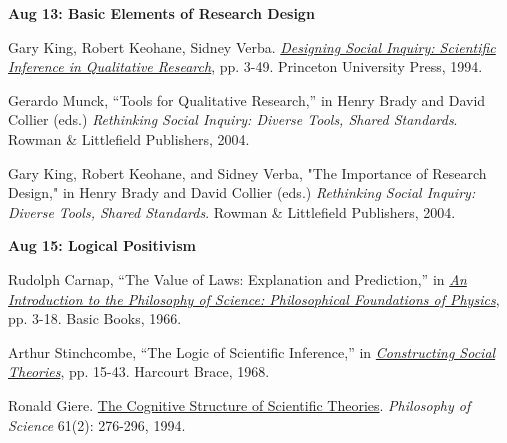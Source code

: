 \documentclass[letterpaper]{article}
\renewenvironment{itemize}{
  \begin{list}{}{
    \setlength{\leftmargin}{1.5em}
  }
}{
  \end{list}
}
\begin{document}
\begin{enumerate}
	\begin{itemize}
		\item {\bf Aug 13: Basic Elements of Research Design}
		\begin{itemize}
			\item[$\bullet$] Gary King, Robert Keohane, Sidney Verba. \href{https://sites.duke.edu/niou/files/2014/06/king94book.pdf}{\emph{Designing Social Inquiry: Scientific Inference in Qualitative Research}}, pp. 3-49. Princeton University Press, 1994.
			\item[$\bullet$] Gerardo Munck, ``Tools for Qualitative Research,'' in  Henry Brady and David Collier (eds.) \emph{Rethinking Social Inquiry: Diverse Tools, Shared Standards}. Rowman \& Littlefield Publishers, 2004.
			\item[$\bullet$] Gary King, Robert Keohane, and Sidney Verba, "The Importance of Research Design," in  Henry Brady and David Collier (eds.) \emph{Rethinking Social Inquiry: Diverse Tools, Shared Standards}. Rowman \& Littlefield Publishers, 2004. 
		\end{itemize}
	\end{itemize}


		\begin{itemize}
		\item {\bf Aug 15: Logical Positivism}
			\begin{itemize}
				\item[$\bullet$] Rudolph Carnap, ``The Value of Laws: Explanation and Prediction,'' in \href{https://archive.org/details/PhilosophicalFoundationsOfPhysics}{\emph{An Introduction to the Philosophy of Science: Philosophical Foundations of Physics}}, pp. 3-18. Basic Books, 1966.
				\item[$\bullet$] Arthur Stinchcombe, ``The Logic of Scientific Inference,'' in \href{http://www.nyu.edu/classes/jackson/design.of.social.research/Readings/Stinchcombe%20-%20Constructing%20Soc%20Thry%20Ch%202.pdf}{\emph{Constructing Social Theories}}, pp. 15-43. Harcourt Brace, 1968.
				\item[$\bullet$] Ronald Giere. \href{https://www.journals.uchicago.edu/doi/pdfplus/10.1086/289800}{The Cognitive Structure of Scientific Theories}. \emph{Philosophy of Science} 61(2): 276-296, 1994.
			\end{itemize}
		\end{itemize}



\end{enumerate}
\end{document}
